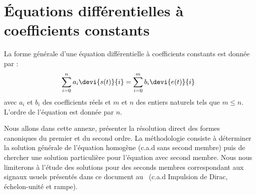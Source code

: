 \chapter{Équations différentielles à coefficients 
         constants\label{annexe-eqndiff}}
La forme générale d'une équation différentielle à coefficients constants est 
donnée par :
\begin{align}
\sum_{i=0}^{n}a_i\devi{s(t)}{i}=\sum_{i=0}^{m}b_i\devi{e(t)}{i}
\end{align}
avec $a_i$ et $b_i$ des coefficients réels et $m$ et $n$ des entiers naturels 
tels que $m\le n$. L'ordre de l'équation est donnée par $n$.

Nous allons dans cette annexe, présenter la résolution direct 
des formes canoniques du premier et du second ordre. La méthodologie consiste
à déterminer la solution générale de l'équation homogène (c.a.d sans second 
membre) puis de chercher une solution particulière pour l'équation avec second 
membre. Nous nous limiterons à l'étude des solutions pour des seconds membres 
correspondant aux signaux usuels présentés dans ce document 
au~ (c.a.d Impulsion de Dirac, échelon-unité et rampe).
